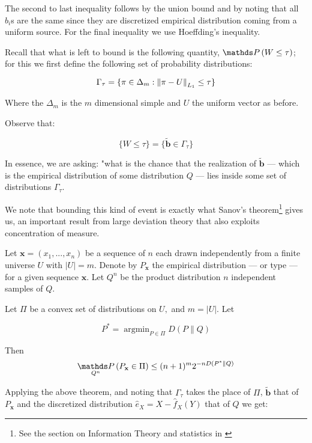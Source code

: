 The second to last inequality follows by the union bound and by noting that all $b_i$s are the same since they
are discretized empirical distribution coming from a uniform source. For the final inequality we use Hoeffding's
inequality.


Recall that what is left to bound is the following quantity, $\Prob\left(W \leq \tau \right)$; 
for this we first define the following set of probability distributions:

$$
    \Gamma_\tau = \{ \pi \in  \Delta_m : \left\lVert\pi - U\right\rVert_{L_1} \leq \tau \}
$$

Where the $\Delta_m$ is the $m$ dimensional simple and $U$ the uniform vector as before.

Observe that: 

$$
    \{ W \leq \tau \} = \{ \tilde{\mathbf{b}} \in \Gamma_\tau \}
$$

In essence, we are asking: "what is the chance that the realization of $\tilde{\mathbf{b}}$ --- which is the 
empirical distribution of some distribution $Q$ --- lies inside some set of distributions $\Gamma_\tau$.

We note that bounding this kind of event is exactly what Sanov's theorem\footnote{See the section on Information Theory and statistics in 
\cite{cover1999elements}} gives us, an important
result from large deviation theory that also exploits concentration of measure.



Let $\mathbf{x} = (x_1, ..., x_n)$ be a sequence of $n$ each drawn independently from 
a finite universe $U$ with $|U| = m$. Denote by $P_\mathbf{x}$ the empirical distribution --- 
or type --- for a given sequence $\mathbf{x}$. Let $Q^{n}$ be the product distribution $n$
independent samples of $Q$. 

\begin{theorem}\label{sanov}

    Let $\Pi$ be a convex set of distributions on $U,$ and $m=|U| .$ Let

    \[
        P^{*}=\operatorname{argmin}_{P \in \Pi} D(P \| Q)
    \]
    
    Then
    \[
        \underset{Q^{n}}{\Prob}\left(P_{\mathbf{x}} \in \Pi\right) \leq(n+1)^{m} 2^{-nD\left(P^{*} \| Q\right)}
    \]
    
\end{theorem}

Applying the above theorem, and noting that $\Gamma_\tau$ takes the place of $\Pi$, $\tilde{\mathbf{b}}$ that of $P_{\mathbf{x}}$
and the discretized distribution $\hat{e}_X = X - \hat{f}_X(Y)$ that of $Q$ we get:

